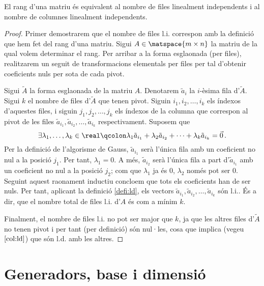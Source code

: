 \begin{prop}
	El rang d'una matriu és equivalent al nombre de files linealment independents i al nombre de columnes linealment independents.
	\begin{proof}
		Primer demostrarem que el nombre de files l.i. correspon amb la definició que hem fet del rang d'una matriu. Sigui $A\in\matspace{m\times n}$ la matriu de la qual volem determinar el rang. Per arribar a la forma esglaonada (per files), realitzarem un seguit de transformacions elementals per files per tal d'obtenir coeficients nuls per sota de cada pivot.
		
		Sigui $\tilde{A}$ la forma esglaonada de la matriu $A$. Denotarem $\tilde{a}_i$ la $i$-èsima fila d'$\tilde{A}$. Sigui $k$ el nombre de files d'$\tilde{A}$ que tenen pivot. Siguin $i_1, i_2, \ldots, i_k$ els índexos d'aquestes files, i siguin $j_1, j_2, \ldots, j_k$ els índexos de la columna que correspon al pivot de les files $\tilde{a}_{i_1}, \tilde{a}_{i_2}, \ldots, \tilde{a}_{i_k}$ respectivament. Suposem que \[\exists\lambda_1,\ldots,\lambda_k\in\real\qcolon \lambda_1\tilde{a}_{i_1} + \lambda_2\tilde{a}_{i_2} + \cdots + \lambda_k\tilde{a}_{i_k} = \vec{0}\,.\] Per la definició de l'algorisme de Gauss, $\tilde{a}_{i_1}$ serà l'única fila amb un coeficient no nul a la posició $j_1$. Per tant, $\lambda_1 = 0$. A més, $\tilde{a}_{i_2}$ serà l'única fila a part d'$\tilde{a}_{i_1}$ amb un coeficient no nul a la posició $j_2$; com que $\lambda_1$ ja és $0$, $\lambda_2$ només pot ser 0. Seguint aquest raonament inductiu concloem que tots els coeficients han de ser nuls. Per tant, aplicant la definició \ref{defi:ld}, els vectors $\tilde{a}_{i_1}, \tilde{a}_{i_2}, \ldots, \tilde{a}_{i_k}$ són l.i.. És a dir, que el nombre total de files l.i. d'$A$ és com a mínim $k$.
		
		Finalment, el nombre de files l.i. no pot ser major que $k$, ja que les altres files d'$\tilde{A}$ no tenen pivot i per tant (per definició) són nul·les, cosa que implica (vegeu $\ref{col:ld}$) que són l.d. amb les altres.
	\end{proof}
\end{prop}


\section{Generadors, base i dimensió}

